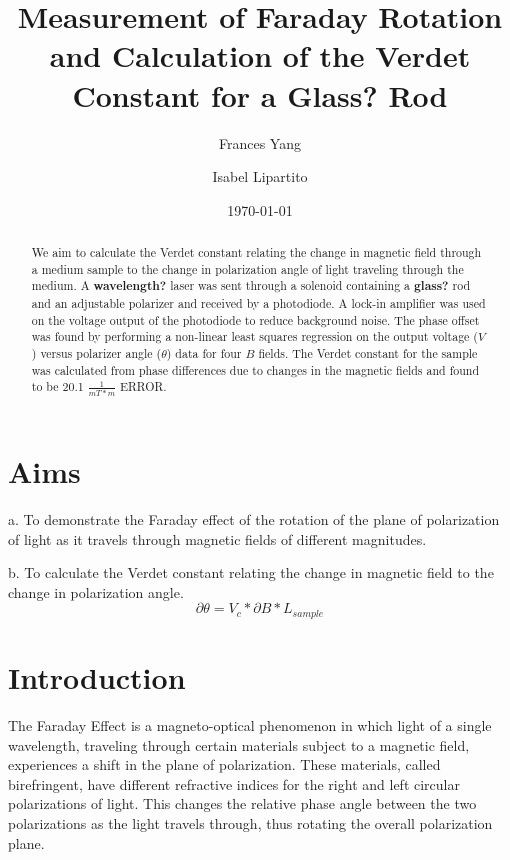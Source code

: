\documentclass[prb,preprint]{revtex4-1}
\begin{document}
\title{Measurement of Faraday Rotation and Calculation of the Verdet Constant for a Glass? Rod}

\author{Frances Yang}

\author{Isabel Lipartito}

\date{\today}

\begin{abstract}
We aim to calculate the Verdet constant relating the change in magnetic field through a medium sample to the change in polarization angle of light traveling through the medium.  A {\bf wavelength?} laser was sent through a solenoid containing a {\bf glass?} rod and an adjustable polarizer and received by a photodiode. A lock-in amplifier was used on the voltage output of the photodiode to reduce background noise. The phase offset was found by performing a non-linear least squares regression on the output voltage ($V$) versus polarizer angle ($\theta$) data for four $B$ fields. The Verdet constant for the sample was calculated from phase differences due to changes in the magnetic fields and found to be 20.1 $\frac{1}{mT*m}$ ERROR. 
\end{abstract}

\maketitle 
\section{Aims}
a.  To demonstrate the Faraday effect of the rotation of the plane of polarization of light as it travels through magnetic fields of different magnitudes.

b.  To calculate the Verdet constant relating the change in magnetic field to the change in polarization angle.
\begin{equation}
\partial \theta =V_{c}*\partial B*L{_{sample}}
\end{equation}

\section{Introduction} 

{The Faraday Effect is a magneto-optical phenomenon in which light of a single wavelength, traveling through certain materials subject to a magnetic field, experiences a shift in the plane of polarization. These materials, called birefringent, have different refractive indices for the right and left circular polarizations of light. This changes the relative phase angle between the two polarizations as the light travels through, thus rotating the overall polarization plane.}
\end{document}
